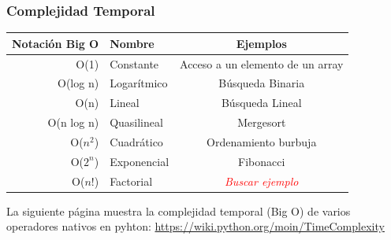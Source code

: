 \documentclass[xcolor=table]{beamer}
\begin{document}
\begin{frame} \frametitle{Complejidad Temporal}  \small  


\begin{table}[t]
\begin{center}
\begin{tabular}{| r | l | c |}
\hline
Notación Big O & Nombre & Ejemplos \\ \hline
O(1)  & Constante & Acceso a un elemento de un array \\
O(log n) & Logarítmico & Búsqueda Binaria \\
O(n) & Lineal & Búsqueda Lineal \\ 
O(n log n) & Quasilineal & Mergesort  \\
O($n^2$) & Cuadrático & Ordenamiento burbuja \\ 
O($2^n$) & Exponencial & Fibonacci \\ 
O($n!$) & Factorial &  \textcolor{red}{\textit{Buscar ejemplo}} \\ \hline
\end{tabular}
\label{tab:BigO}
\end{center}
\end{table}

La siguiente página muestra la complejidad temporal (Big O) de varios operadores nativos en pyhton:
\url{https://wiki.python.org/moin/TimeComplexity}

\end{frame} 
\end{document}
